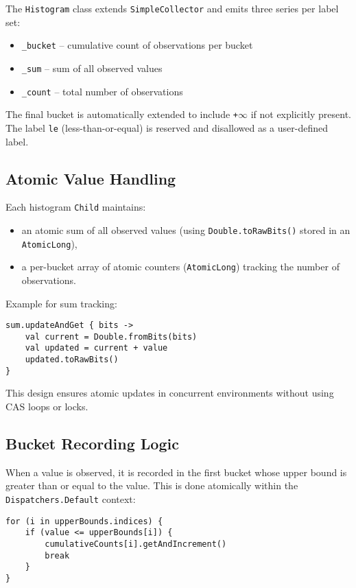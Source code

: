 The \texttt{Histogram} class extends \texttt{SimpleCollector} and emits three series per label set:
\begin{itemize}
    \item \texttt{\_bucket} – cumulative count of observations per bucket
    \item \texttt{\_sum} – sum of all observed values
    \item \texttt{\_count} – total number of observations
\end{itemize}

The final bucket is automatically extended to include \texttt{+\(\infty\)} if not explicitly present. The label \texttt{le} (less-than-or-equal) is reserved and disallowed as a user-defined label.

\subsection{Atomic Value Handling}

Each histogram \texttt{Child} maintains:
\begin{itemize}
    \item an atomic sum of all observed values (using \texttt{Double.toRawBits()} stored in an \texttt{AtomicLong}),
    \item a per-bucket array of atomic counters (\texttt{AtomicLong}) tracking the number of observations.
\end{itemize}

Example for sum tracking:
\begin{verbatim}
sum.updateAndGet { bits ->
    val current = Double.fromBits(bits)
    val updated = current + value
    updated.toRawBits()
}
\end{verbatim}

This design ensures atomic updates in concurrent environments without using CAS loops or locks.

\subsection{Bucket Recording Logic}

When a value is observed, it is recorded in the first bucket whose upper bound is greater than or equal to the value. This is done atomically within the \texttt{Dispatchers.Default} context:

\begin{verbatim}
for (i in upperBounds.indices) {
    if (value <= upperBounds[i]) {
        cumulativeCounts[i].getAndIncrement()
        break
    }
}
\end{verbatim}

